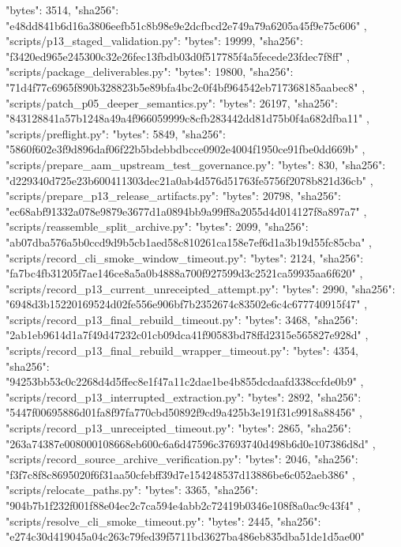 {{{      "bytes": 3514,
      "sha256": "e48dd841b6d16a3806eefb51c8b98e9e2dcfbcd2e749a79a6205a45f9e75c606"
    },
    "scripts/p13_staged_validation.py": {
      "bytes": 19999,
      "sha256": "f3420ed965e245300c32e26fec13fbdb03d0f517785f4a5fecede23fdec7f8ff"
    },
    "scripts/package_deliverables.py": {
      "bytes": 19800,
      "sha256": "71d4f77c6965f890b328823b5e89bfa4bc2c0f4bf964542eb717368185aabec8"
    },
    "scripts/patch_p05_deeper_semantics.py": {
      "bytes": 26197,
      "sha256": "843128841a57b1248a49a4f966059999c8cfb283442dd81d75b0f4a682dfba11"
    },
    "scripts/preflight.py": {
      "bytes": 5849,
      "sha256": "5860f602e3f9d896daf06f22b5bdebbdbcce0902e4004f1950ce91fbe0dd669b"
    },
    "scripts/prepare_aam_upstream_test_governance.py": {
      "bytes": 830,
      "sha256": "d229340d725e23b600411303dec21a0ab4d576d51763fe5756f2078b821d36cb"
    },
    "scripts/prepare_p13_release_artifacts.py": {
      "bytes": 20798,
      "sha256": "ec68abf91332a078e9879e3677d1a0894bb9a99ff8a2055d4d014127f8a897a7"
    },
    "scripts/reassemble_split_archive.py": {
      "bytes": 2099,
      "sha256": "ab07dba576a5b0ccd9d9b5cb1aed58c810261ca158e7ef6d1a3b19d55fc85cba"
    },
    "scripts/record_cli_smoke_window_timeout.py": {
      "bytes": 2124,
      "sha256": "fa7bc4fb31205f7ae146ce8a5a0b4888a700f927599d3c2521ca59935aa6f620"
    },
    "scripts/record_p13_current_unreceipted_attempt.py": {
      "bytes": 2990,
      "sha256": "6948d3b15220169524d02fe556e906bf7b2352674c83502e6c4c677740915f47"
    },
    "scripts/record_p13_final_rebuild_timeout.py": {
      "bytes": 3468,
      "sha256": "2ab1eb9614d1a7f49d47232c01cb09dca41f90583bd78ffd2315e565827e928d"
    },
    "scripts/record_p13_final_rebuild_wrapper_timeout.py": {
      "bytes": 4354,
      "sha256": "94253bb53c0c2268d4d5ffec8e1f47a11c2dae1be4b855dcdaafd338ccfde0b9"
    },
    "scripts/record_p13_interrupted_extraction.py": {
      "bytes": 2892,
      "sha256": "5447f00695886d01fa8f97fa770cbd50892f9cd9a425b3e191f31c9918a88456"
    },
    "scripts/record_p13_unreceipted_timeout.py": {
      "bytes": 2865,
      "sha256": "263a74387e008000108668eb600c6a6d47596c37693740d498b6d0e107386d8d"
    },
    "scripts/record_source_archive_verification.py": {
      "bytes": 2046,
      "sha256": "f3f7c8f8c8695020f6f31aa50cfebff39d7e154248537d13886be6c052aeb386"
    },
    "scripts/relocate_paths.py": {
      "bytes": 3365,
      "sha256": "904b7b1f232f001f88e04ec2c7ca594e4abb2c72419b0346e108f8a0ac9c43f4"
    },
    "scripts/resolve_cli_smoke_timeout.py": {
      "bytes": 2445,
      "sha256": "e274c30d419045a04c263c79fed39f5711bd3627ba486eb835dba51de1d5ae00"
}}}
